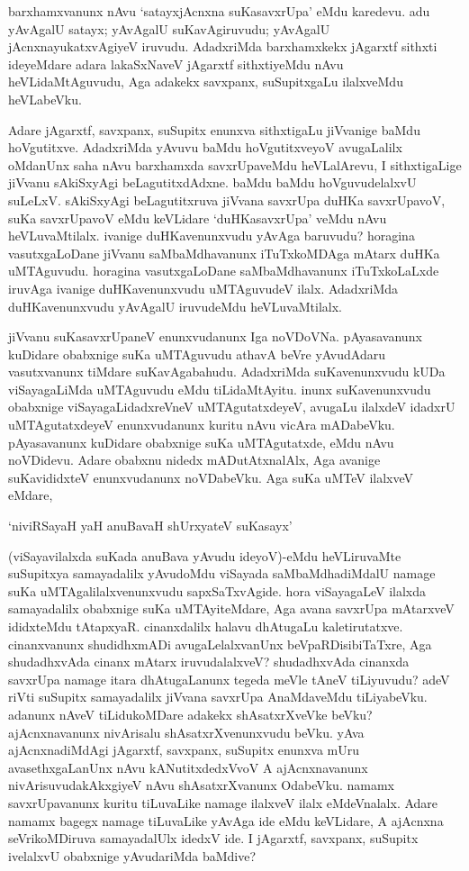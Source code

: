 barxhamxvanunx nAvu `satayxjAcnxna suKasavxrUpa' eMdu karedevu. adu yAvAgalU satayx; yAvAgalU suKavAgiruvudu; yAvAgalU jAcnxnayukatxvAgiyeV iruvudu. AdadxriMda barxhamxkekx jAgarxtf sithxti ideyeMdare adara lakaSxNaveV jAgarxtf sithxtiyeMdu nAvu heVLidaMtAguvudu, Aga adakekx savxpanx, suSupitxgaLu ilalxveMdu heVLabeVku.

Adare jAgarxtf, savxpanx, suSupitx enunxva sithxtigaLu jiVvanige baMdu hoVgutitxve. AdadxriMda yAvuvu baMdu hoVgutitxveyoV avugaLalilx oMdanUnx saha nAvu barxhamxda savxrUpaveMdu heVLalArevu, I sithxtigaLige jiVvanu sAkiSxyAgi beLagutitxdAdxne. baMdu baMdu hoVguvudelalxvU suLeLxV. sAkiSxyAgi beLagutitxruva jiVvana savxrUpa duHKa savxrUpavoV, suKa savxrUpavoV eMdu keVLidare `duHKasavxrUpa' veMdu nAvu heVLuvaMtilalx. ivanige duHKavenunxvudu yAvAga baruvudu? horagina vasutxgaLoDane jiVvanu saMbaMdhavanunx iTuTxkoMDAga mAtarx duHKa uMTAguvudu. horagina vasutxgaLoDane saMbaMdhavanunx iTuTxkoLaLxde iruvAga ivanige duHKavenunxvudu uMTAguvudeV ilalx. AdadxriMda duHKavenunxvudu yAvAgalU iruvudeMdu heVLuvaMtilalx.

jiVvanu suKasavxrUpaneV enunxvudanunx Iga noVDoVNa. pAyasavanunx kuDidare obabxnige suKa uMTAguvudu athavA beVre yAvudAdaru vasutxvanunx tiMdare suKavAgabahudu. AdadxriMda suKavenunxvudu kUDa viSayagaLiMda uMTAguvudu eMdu tiLidaMtAyitu. inunx suKavenunxvudu obabxnige viSayagaLidadxreVneV uMTAgutatxdeyeV, avugaLu ilalxdeV idadxrU uMTAgutatxdeyeV enunxvudanunx kuritu nAvu vicAra mADabeVku. pAyasavanunx kuDidare obabxnige suKa uMTAgutatxde, eMdu nAvu noVDidevu. Adare obabxnu nidedx mADutAtxnalAlx, Aga avanige suKavididxteV enunxvudanunx noVDabeVku. Aga suKa uMTeV ilalxveV eMdare,

\begin{shloka}
`niviRSayaH yaH anuBavaH shUrxyateV suKasayx'
\end{shloka}

(viSayavilalxda suKada anuBava yAvudu ideyoV)-eMdu heVLiruvaMte suSupitxya samayadalilx yAvudoMdu viSayada saMbaMdhadiMdalU namage suKa uMTAgalilalxvenunxvudu sapxSaTxvAgide. hora viSayagaLeV ilalxda samayadalilx obabxnige suKa uMTAyiteMdare, Aga avana savxrUpa mAtarxveV ididxteMdu tAtapxyaR. cinanxdalilx halavu dhAtugaLu kaletirutatxve. cinanxvanunx shudidhxmADi avugaLelalxvanUnx beVpaRDisibiTaTxre, Aga shudadhxvAda cinanx mAtarx iruvudalalxveV? shudadhxvAda cinanxda savxrUpa namage itara dhAtugaLanunx tegeda meVle tAneV tiLiyuvudu? adeV riVti suSupitx samayadalilx jiVvana savxrUpa AnaMdaveMdu tiLiyabeVku. adanunx nAveV tiLidukoMDare adakekx shAsatxrXveVke beVku? ajAcnxnavanunx nivArisalu shAsatxrXvenunxvudu beVku. yAva ajAcnxnadiMdAgi jAgarxtf, savxpanx, suSupitx enunxva mUru avasethxgaLanUnx nAvu kANutitxdedxVvoV A ajAcnxnavanunx nivArisuvudakAkxgiyeV nAvu shAsatxrXvanunx OdabeVku. namamx savxrUpavanunx kuritu tiLuvaLike namage ilalxveV ilalx eMdeVnalalx. Adare namamx bagegx namage tiLuvaLike yAvAga ide eMdu keVLidare, A ajAcnxna seVrikoMDiruva samayadalUlx idedxV ide. I jAgarxtf, savxpanx, suSupitx ivelalxvU obabxnige yAvudariMda baMdive?

